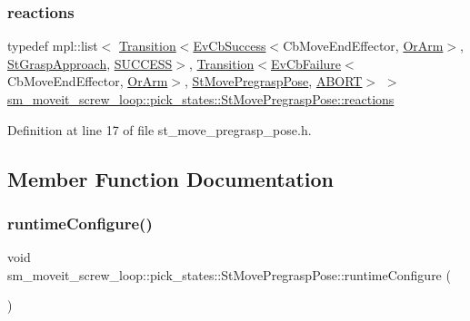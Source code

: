 \subsubsection{\texorpdfstring{reactions}{reactions}}
{\footnotesize\ttfamily typedef mpl\+::list$<$ \hyperlink{classsmacc_1_1Transition}{Transition}$<$\hyperlink{structsmacc_1_1EvCbSuccess}{Ev\+Cb\+Success}$<$Cb\+Move\+End\+Effector, \hyperlink{classsm__moveit__screw__loop_1_1OrArm}{Or\+Arm}$>$, \hyperlink{structsm__moveit__screw__loop_1_1pick__states_1_1StGraspApproach}{St\+Grasp\+Approach}, \hyperlink{structsmacc_1_1default__transition__tags_1_1SUCCESS}{S\+U\+C\+C\+E\+SS}$>$, \hyperlink{classsmacc_1_1Transition}{Transition}$<$\hyperlink{structsmacc_1_1EvCbFailure}{Ev\+Cb\+Failure}$<$Cb\+Move\+End\+Effector, \hyperlink{classsm__moveit__screw__loop_1_1OrArm}{Or\+Arm}$>$, \hyperlink{structsm__moveit__screw__loop_1_1pick__states_1_1StMovePregraspPose}{St\+Move\+Pregrasp\+Pose}, \hyperlink{structsmacc_1_1default__transition__tags_1_1ABORT}{A\+B\+O\+RT}$>$ $>$ \hyperlink{structsm__moveit__screw__loop_1_1pick__states_1_1StMovePregraspPose_a46ddf440f06508aadf4f8e5f6c752681}{sm\+\_\+moveit\+\_\+screw\+\_\+loop\+::pick\+\_\+states\+::\+St\+Move\+Pregrasp\+Pose\+::reactions}}



Definition at line 17 of file st\+\_\+move\+\_\+pregrasp\+\_\+pose.\+h.



\subsection{Member Function Documentation}
\mbox{\label{structsm__moveit__screw__loop_1_1pick__states_1_1StMovePregraspPose_a364b45012382fbf007accac5cc583b26}} 
\subsubsection{\texorpdfstring{runtime\+Configure()}{runtimeConfigure()}}
{\footnotesize\ttfamily void sm\+\_\+moveit\+\_\+screw\+\_\+loop\+::pick\+\_\+states\+::\+St\+Move\+Pregrasp\+Pose\+::runtime\+Configure (\begin{DoxyParamCaption}{ }\end{DoxyParamCaption})\hspace{0.3cm}{\ttfamily [inline]}}



